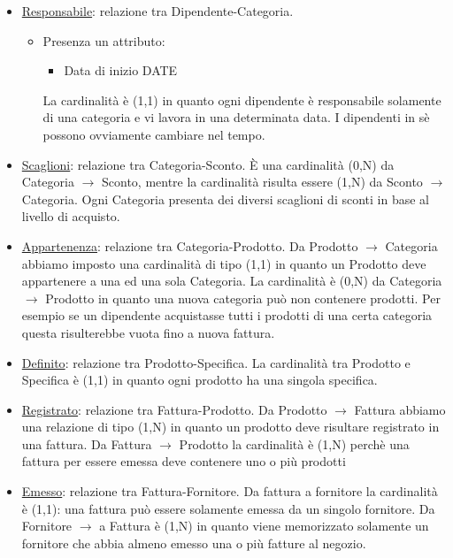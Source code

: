 \begin{itemize}

\item \underline{Responsabile}: relazione tra Dipendente-Categoria.
  \begin{itemize}
  \item Presenza un attributo:
  \begin{itemize}
  \item Data di inizio DATE
  \end{itemize}
  La cardinalit\`a \`e (1,1) in quanto ogni dipendente \`e responsabile solamente di una categoria e vi lavora in una determinata data. I dipendenti in s\`e possono ovviamente cambiare nel tempo.

  \end{itemize}

\item \underline{Scaglioni}: relazione tra Categoria-Sconto. \`E una cardinalit\`a (0,N) da Categoria $\to$ Sconto, mentre la cardinalit\`a risulta essere (1,N) da Sconto $\to$ Categoria. \newline
Ogni Categoria presenta dei diversi scaglioni di sconti in base al livello di acquisto.

\item \underline{Appartenenza}: relazione tra Categoria-Prodotto. Da Prodotto $\to$ Categoria abbiamo imposto una cardinalit\`a di tipo (1,1) in quanto un Prodotto deve appartenere a una ed una sola Categoria. \newline
  La cardinalit\`a \`e (0,N) da Categoria $\to$ Prodotto in quanto una nuova categoria pu\`o non contenere prodotti.\newline
  Per esempio se un dipendente acquistasse tutti  i prodotti di una certa categoria questa risulterebbe vuota fino a nuova fattura.

\item \underline{Definito}: relazione tra Prodotto-Specifica. La cardinalit\`a tra Prodotto e Specifica \`e (1,1) in quanto ogni prodotto ha una singola specifica.

\item \underline{Registrato}: relazione tra Fattura-Prodotto. Da Prodotto $\to$ Fattura abbiamo una relazione di tipo (1,N) in quanto un prodotto deve risultare registrato in una fattura. \newline
  Da Fattura $\to$ Prodotto la cardinalit\`a \`e (1,N) perch\`e una fattura per essere emessa deve contenere uno o pi\`u prodotti

\item \underline{Emesso}: relazione tra Fattura-Fornitore. Da fattura a fornitore la cardinalit\`a \`e (1,1): una fattura pu\`o essere solamente emessa da un singolo fornitore. \newline
  Da Fornitore $\to$ a Fattura \`e (1,N) in quanto viene memorizzato solamente un fornitore che abbia almeno emesso una o pi\`u fatture al negozio.


\end{itemize}
